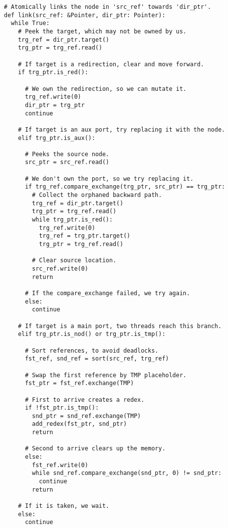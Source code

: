 \documentclass{article}
\begin{document}
\begin{lstlisting}
# Atomically links the node in 'src_ref' towards 'dir_ptr'.
def link(src_ref: &Pointer, dir_ptr: Pointer):
  while True:
    # Peek the target, which may not be owned by us.
    trg_ref = dir_ptr.target()
    trg_ptr = trg_ref.read()

    # If target is a redirection, clear and move forward.
    if trg_ptr.is_red():

      # We own the redirection, so we can mutate it.
      trg_ref.write(0)
      dir_ptr = trg_ptr
      continue

    # If target is an aux port, try replacing it with the node.
    elif trg_ptr.is_aux():

      # Peeks the source node.
      src_ptr = src_ref.read()

      # We don't own the port, so we try replacing it.
      if trg_ref.compare_exchange(trg_ptr, src_ptr) == trg_ptr:
        # Collect the orphaned backward path.
        trg_ref = dir_ptr.target()
        trg_ptr = trg_ref.read()
        while trg_ptr.is_red():
          trg_ref.write(0)
          trg_ref = trg_ptr.target()
          trg_ptr = trg_ref.read()

        # Clear source location.
        src_ref.write(0)
        return

      # If the compare_exchange failed, we try again.
      else:
        continue

    # If target is a main port, two threads reach this branch.
    elif trg_ptr.is_nod() or trg_ptr.is_tmp():

      # Sort references, to avoid deadlocks.
      fst_ref, snd_ref = sort(src_ref, trg_ref)

      # Swap the first reference by TMP placeholder.
      fst_ptr = fst_ref.exchange(TMP)

      # First to arrive creates a redex.
      if !fst_ptr.is_tmp():
        snd_ptr = snd_ref.exchange(TMP)
        add_redex(fst_ptr, snd_ptr)
        return

      # Second to arrive clears up the memory.
      else:
        fst_ref.write(0)
        while snd_ref.compare_exchange(snd_ptr, 0) != snd_ptr:
          continue
        return

    # If it is taken, we wait.
    else:
      continue
\end{lstlisting}
\end{document}

